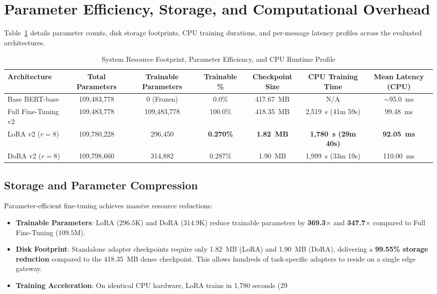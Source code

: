 \documentclass[conference]{IEEEtran}
\begin{document}
\section{Parameter Efficiency, Storage, and Computational Overhead}
\label{sec:efficiency}

Table~\ref{tab:efficiency_profile} details parameter counts, disk storage footprints, CPU training durations, and per-message latency profiles across the evaluated architectures.

\begin{table}[t]
\caption{System Resource Footprint, Parameter Efficiency, and CPU Runtime Profile}
\label{tab:efficiency_profile}
\centering
\begin{tabularx}{\textwidth}{lcccccc}
\toprule
\textbf{Architecture} & \textbf{Total Parameters} & \textbf{Trainable Parameters} & \textbf{Trainable \%} & \textbf{Checkpoint Size} & \textbf{CPU Training Time} & \textbf{Mean Latency (CPU)} \\
\midrule
Base BERT-base & 109,483,778 & 0 (Frozen) & 0.0\% & 417.67~MB & N/A & $\sim$95.0~ms \\
Full Fine-Tuning v2 & 109,483,778 & 109,483,778 & 100.0\% & 418.35~MB & 2,519~s (41m 59s) & 99.48~ms \\
LoRA v2 ($r=8$) & 109,780,228 & 296,450 & \textbf{0.270\%} & \textbf{1.82~MB} & \textbf{1,780~s (29m 40s)} & \textbf{92.05~ms} \\
DoRA v2 ($r=8$) & 109,798,660 & 314,882 & 0.287\% & 1.90~MB & 1,999~s (33m 19s) & 110.00~ms \\
\bottomrule
\end{tabularx}
\end{table}

\subsection{Storage and Parameter Compression}
Parameter-efficient fine-tuning achieves massive resource reductions:
\begin{itemize}
    \item \textbf{Trainable Parameters}: LoRA ($296.5\text{K}$) and DoRA ($314.9\text{K}$) reduce trainable parameters by \textbf{369.3$\times$} and \textbf{347.7$\times$} compared to Full Fine-Tuning ($109.5\text{M}$).
    \item \textbf{Disk Footprint}: Standalone adapter checkpoints require only 1.82~MB (LoRA) and 1.90~MB (DoRA), delivering a \textbf{99.55\% storage reduction} compared to the 418.35~MB dense checkpoint. This allows hundreds of task-specific adapters to reside on a single edge gateway.
    \item \textbf{Training Acceleration}: On identical CPU hardware, LoRA trains in 1,780 seconds (29%
\end{itemize}
\end{document}
